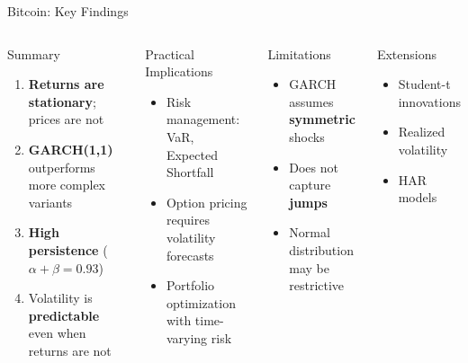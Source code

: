 \documentclass[9pt, aspectratio=169, t]{beamer}
\begin{document}
\begin{frame}{Bitcoin: Key Findings}
    \begin{columns}[T]
        \begin{block}{Summary}
            \begin{enumerate}
                \item \textbf{Returns are stationary}; prices are not
                \item \textbf{GARCH(1,1)} outperforms more complex variants
                \item \textbf{High persistence} ($\alpha + \beta = 0.93$)
                \item Volatility is \textbf{predictable} even when returns are not
            \end{enumerate}
        \end{block}

        \vspace{0.3cm}

        \begin{exampleblock}{Practical Implications}
            \begin{itemize}
                \item Risk management: VaR, Expected Shortfall
                \item Option pricing requires volatility forecasts
                \item Portfolio optimization with time-varying risk
            \end{itemize}
        \end{exampleblock}

        \begin{alertblock}{Limitations}
            \begin{itemize}
                \item GARCH assumes \textbf{symmetric} shocks
                \item Does not capture \textbf{jumps}
                \item Normal distribution may be restrictive
            \end{itemize}
        \end{alertblock}

        \vspace{0.3cm}

        \begin{block}{Extensions}
            \begin{itemize}
                \item Student-t innovations
                \item Realized volatility
                \item HAR models
            \end{itemize}
        \end{block}
    \end{columns}
\end{frame}
\end{document}
